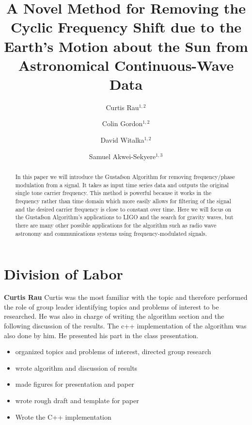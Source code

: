\documentclass[onecolumn, groupedaddress, 10pt]{revtex4-1}
\begin{document}
\author{Curtis Rau$^{1,2}$}
\author{Colin Gordon$^{1,2}$}
\author{David Witalka$^{1,2}$}
\author{Samuel Akwei-Sekyere$^{1,3}$}

\title{A Novel Method for Removing the Cyclic Frequency Shift due to the Earth's Motion about the Sun from Astronomical Continuous-Wave Data}


\begin{abstract}
In this paper we will introduce the Gustafson Algorithm for removing frequency/phase modulation from a signal.  It takes as input time series data and outputs the original single tone carrier frequency. This method is powerful because it works in the frequency rather than time domain which more easily allows for filtering of the signal and the desired carrier frequency is close to constant over time. Here we will focus on the Gustafson Algorithm's applications to LIGO and the search for gravity waves, but there are many other possible applications for the algorithm such as radio wave astronomy and communications systems using frequency-modulated signals.

\citep{Saulson}
\citep{LSCall}
\citep{Deanna}
\citep{folland}
\citep{griffiths}
\end{abstract}

\maketitle


\pagebreak

\section*{Division of Labor}
\textbf{Curtis Rau}
Curtis was the most familiar with the topic and therefore performed the role of group leader identifying topics and problems of interest to be researched. He was also in charge of writing the algorithm section and the following discussion of the results. The c++ implementation of the algorithm was also done by him. He presented his part in the class presentation.
\begin{itemize}
\item organized topics and problems of interest, directed group research
\item wrote algorithm and discussion of results
\item made figures for presentation and paper
\item wrote rough draft and template for paper
\item Wrote the C++ implementation
\end{itemize}
\end{document}
